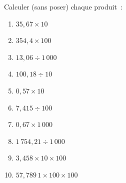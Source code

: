 \documentclass[exercice]{thedocument}%
\begin{document}
%
Calculer (sans poser) chaque produit~:
\begin{enumerate}
    \item $35,67\times10$
    \item $354,4\times100$
    \item $13,06\div1\,000$
    \item $100,18\div10$
    \item $0,57\times10$
    \item $7,415\div100$
    \item $0,67\times1\,000$
    \item $1\,754,21\div1\,000$
    \item $3,458\times10\times100$
    \item $57,789\,1\times100\times100$
\end{enumerate}
\end{document}
